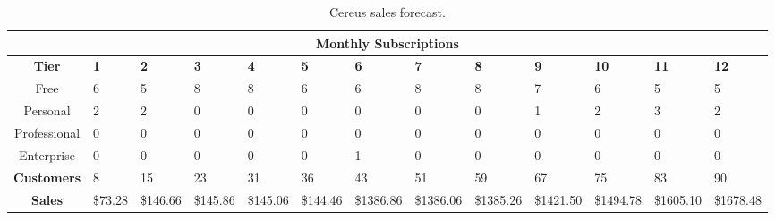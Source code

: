 
\begin{sidewaystable}
\begin{table}[H]
  \centering
  \setlength\tabcolsep{5pt}
  \def\arraystretch{1.2}%

  \begin{tabularx}{\textwidth}{X X X X X X X X X X X X X}

    \multicolumn{13}{c}{\textbf{Monthly Subscriptions}} \\

    \hline
    
    \multicolumn{1}{c|}{\textbf{Tier}} & \textbf{1} & \textbf{2} & \textbf{3} & \textbf{4} & \textbf{5} & \textbf{6} & \textbf{7} & \textbf{8} & \textbf{9} & \textbf{10} & \textbf{11} & \textbf{12}  \\

    \hline

    \multicolumn{1}{c|}{Free} & 6 & 5 & 8 & 8 & 6 & 6 & 8 & 8 & 7 & 6 & 5 & 5  \\

    \multicolumn{1}{c|}{Personal} & 2 & 2 & 0 & 0 & 0 & 0 & 0 & 0 & 1 & 2 & 3 & 2  \\

    \multicolumn{1}{c|}{Professional} & 0 & 0 & 0 & 0 & 0 & 0 & 0 & 0 & 0 & 0 & 0 & 0  \\

    \multicolumn{1}{c|}{Enterprise} & 0 & 0 & 0 & 0 & 0 & 1 & 0 & 0 & 0 & 0 & 0 & 0  \\

    \hline

    \multicolumn{1}{c|}{\textbf{Customers}} & 8 & 15 & 23 & 31 & 36 & 43 & 51 & 59 & 67 & 75 & 83 & 90  \\

    \hline

    \multicolumn{1}{c|}{\textbf{Sales}} & \$73.28 & \$146.66 & \$145.86 & \$145.06 & \$144.46 & \$1386.86 & \$1386.06  & \$1385.26 & \$1421.50 & \$1494.78 & \$1605.10 & \$1678.48  \\

  \end{tabularx}
  \caption{Cereus sales forecast.}
  \label{table.sales.forecast}
\end{table}
\end{sidewaystable}
